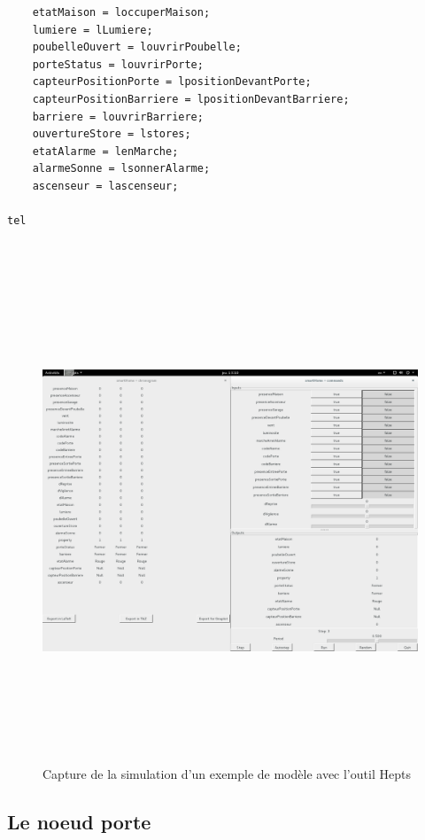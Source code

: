 \documentclass{svjour3}
\begin{document}
\begin{lstlisting}
	etatMaison = loccuperMaison;
	lumiere = lLumiere;
	poubelleOuvert = louvrirPoubelle;
	porteStatus = louvrirPorte;
	capteurPositionPorte = lpositionDevantPorte;
	capteurPositionBarriere = lpositionDevantBarriere;
	barriere = louvrirBarriere;
	ouvertureStore = lstores;
	etatAlarme = lenMarche;
	alarmeSonne = lsonnerAlarme;
	ascenseur = lascenseur;
	
tel
 
\end{lstlisting}

\begin{figure}[!h]
 \includegraphics[height=15cm, width=15cm]{simulation.png}
 \caption{Capture de la simulation d'un exemple de modèle avec l'outil Hepts}
 \label{schemaSimilation}
\end{figure}

\subsection*{Le noeud porte}
\end{document}
